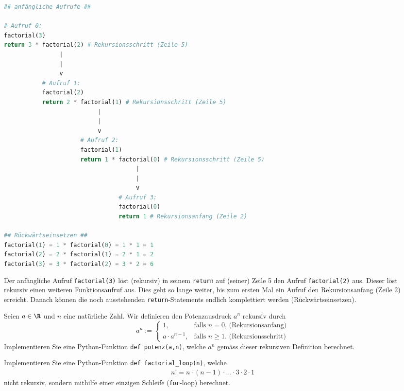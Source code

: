 \lstset{basicstyle=\ttfamily\footnotesize}
\begin{lstlisting}[language=Python,caption=rekursive Berechnung der Fakultät,label=listing:lowtech]
## anfängliche Aufrufe ##

# Aufruf 0:
factorial(3)
return 3 * factorial(2) # Rekursionsschritt (Zeile 5)
                |
                |
                v 
           # Aufruf 1:
           factorial(2)
           return 2 * factorial(1) # Rekursionsschritt (Zeile 5)
                           |
                           |
                           v
                      # Aufruf 2:
                      factorial(1)
                      return 1 * factorial(0) # Rekursionsschritt (Zeile 5)
                                      |
                                      |
                                      v
                                 # Aufruf 3:
                                 factorial(0)
                                 return 1 # Rekursionsanfang (Zeile 2)

## Rückwärtseinsetzen ##
factorial(1) = 1 * factorial(0) = 1 * 1 = 1
factorial(2) = 2 * factorial(1) = 2 * 1 = 2
factorial(3) = 3 * factorial(2) = 3 * 2 = 6
\end{lstlisting}
Der anfängliche Aufruf \lstinline|factorial(3)| löst (rekursiv) in seinem \lstinline|return| auf (seiner) Zeile 5 den Aufruf \lstinline|factorial(2)| aus. Dieser löst rekursiv einen weiteren Funktionsaufruf aus. Dies geht so lange weiter, bis zum ersten Mal ein Aufruf den Rekursionsanfang (Zeile 2) erreicht. Danach können die noch ausstehenden \lstinline|return|-Statements endlich komplettiert werden (Rückwärtseinsetzen).

\clearpage

\begin{myexercise}\label{myexercise:0303}
Seien $a\in\R$ und $n$ eine natürliche Zahl. Wir definieren den Potenzausdruck $a^n$ rekursiv durch
\[
  a^n := 
  \begin{cases}
    1, &\text{falls $n=0$, (Rekursionsanfang)} \\
    a\cdot a^{n-1}, & \text{falls  $n\geq 1$. (Rekursionsschritt)}
  \end{cases}
\]
Implementieren Sie eine Python-Funktion \lstinline|def potenz(a,n)|, welche $a^n$ gemäss dieser rekursiven Definition berechnet.
\end{myexercise}

\begin{myexercise}\label{myexercise:0302}
Implementieren Sie eine Python-Funktion \lstinline|def factorial_loop(n)|, welche
\begin{align*}
    n! = n\cdot (n-1)\cdot\ldots\cdot 3\cdot 2\cdot 1
\end{align*}
nicht rekursiv, sondern mithilfe einer einzigen Schleife (\lstinline|for|-loop) berechnet.
\end{myexercise}


